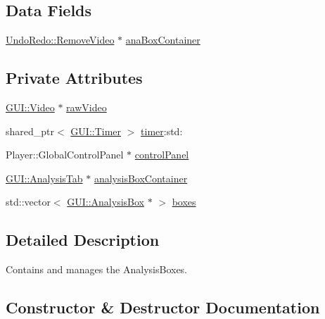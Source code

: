 \subsection*{Data Fields}
\begin{DoxyCompactItemize}
\item 
\hyperlink{classUndoRedo_1_1RemoveVideo}{Undo\+Redo\+::\+Remove\+Video} $\ast$ \hyperlink{classGUI_1_1AnalysisBoxContainer_a14b06011d2f6be0da89f067a1e838b09}{ana\+Box\+Container}
\end{DoxyCompactItemize}
\subsection*{Private Attributes}
\begin{DoxyCompactItemize}
\item 
\hyperlink{classGUI_1_1Video}{G\+U\+I\+::\+Video} $\ast$ \hyperlink{classGUI_1_1AnalysisBoxContainer_a36ae288eba0c53b885d93498c8c68469}{raw\+Video}
\item 
shared\+\_\+ptr$<$ \hyperlink{classGUI_1_1Timer}{G\+U\+I\+::\+Timer} $>$ \hyperlink{classGUI_1_1AnalysisBoxContainer_a38f007cbe577c8cecfadf2358a3049fc}{timer}\+:std\+:
\item 
Player\+::\+Global\+Control\+Panel $\ast$ \hyperlink{classGUI_1_1AnalysisBoxContainer_aa7d83e3ba62ee643206acd2a48e058e3}{control\+Panel}
\item 
\hyperlink{classGUI_1_1AnalysisTab}{G\+U\+I\+::\+Analysis\+Tab} $\ast$ \hyperlink{classGUI_1_1AnalysisBoxContainer_a6754830af7090fa0a2bf7c94fbb188cc}{analysis\+Box\+Container}
\item 
std\+::vector$<$ \hyperlink{classGUI_1_1AnalysisBox}{G\+U\+I\+::\+Analysis\+Box} $\ast$ $>$ \hyperlink{classGUI_1_1AnalysisBoxContainer_a5083484e3ec5273e8a150e11fea5108b}{boxes}
\end{DoxyCompactItemize}


\subsection{Detailed Description}
Contains and manages the Analysis\+Boxes. 

\subsection{Constructor \& Destructor Documentation}
\hypertarget{classGUI_1_1AnalysisBoxContainer_ae603e523cc42100eccf571ff85ca39e8}{}
